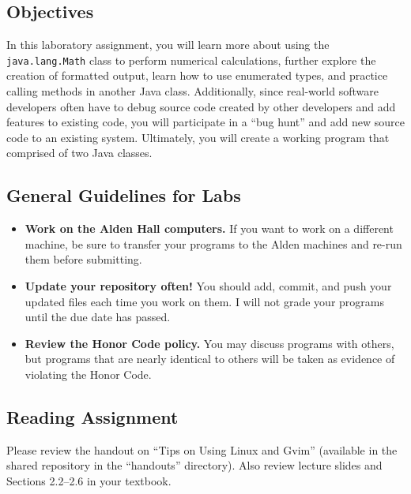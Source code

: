 



\subsection*{Objectives}

In this laboratory assignment, you will learn more about using the {\tt java.lang.Math} class to perform numerical
calculations, further explore the creation of formatted output, learn how to use enumerated types, and practice calling
methods in another Java class.  Additionally, since real-world software developers often have to debug source code
created by other developers and add features to existing code, you will participate in a ``bug hunt'' and add new
source code to an existing system. Ultimately, you will create a working program that comprised of two Java classes.

\subsection*{General Guidelines for Labs}

\begin{itemize}
\item
{\bf Work on the Alden Hall computers.} If you want to work on a different
machine, be sure to transfer your programs to the Alden
machines and re-run them before submitting.
\item
{\bf Update your repository often!} You should add, commit, 
and push your updated files each time you work on them.  I will not grade 
your programs until the due date has passed.
\item
{\bf Review the Honor Code policy.} You
may discuss programs with others, but programs that are nearly identical
to others will be taken as evidence of violating the Honor Code.
\end{itemize}

\subsection*{Reading Assignment}

Please review the handout on ``Tips on Using Linux and Gvim'' (available in the shared repository in the ``handouts''
  directory).  Also review lecture slides and Sections 2.2--2.6 in your textbook.

